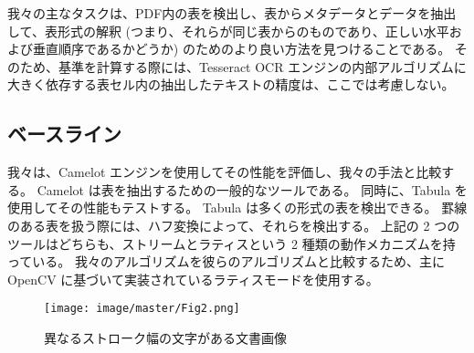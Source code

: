 \documentclass[uplatex, twocolumn,10pt]{jsarticle}
\begin{document}
我々の主なタスクは、PDF内の表を検出し、表からメタデータとデータを抽出して、表形式の解釈 (つまり、それらが同じ表からのものであり、正しい水平および垂直順序であるかどうか) のためのより良い方法を見つけることである。
そのため、基準を計算する際には、Tesseract OCR エンジンの内部アルゴリズムに大きく依存する表セル内の抽出したテキストの精度は、ここでは考慮しない。


\subsection{ベースライン}
我々は、Camelot エンジンを使用してその性能を評価し、我々の手法と比較する。
Camelot は表を抽出するための一般的なツールである。
同時に、Tabula を使用してその性能もテストする。
Tabula は多くの形式の表を検出できる。
罫線のある表を扱う際には、ハフ変換によって、それらを検出する。
上記の 2 つのツールはどちらも、ストリームとラティスという 2 種類の動作メカニズムを持っている。
我々のアルゴリズムを彼らのアルゴリズムと比較するため、主に OpenCV に基づいて実装されているラティスモードを使用する。











\begin{figure}[tp]
    \begin{center}
        \texttt{[image: image/master/Fig2.png]}
        \caption{異なるストローク幅の文字がある文書画像}
        \label{fig2}
    \end{center}
\end{figure}
\end{document}
